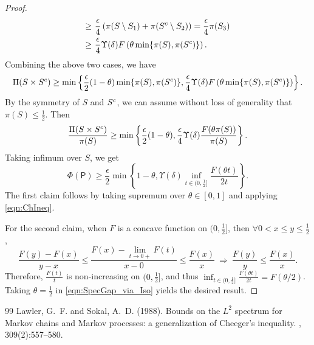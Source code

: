 \documentclass[10pt,a4paper]{amsart}
\newcommand{\Brac}[1]{\left(#1\right)}
\newcommand{\St}{\Rightarrow}
\newcommand{\matc}{^{\rm c}}
\newcommand{\sfP}{\mathsf{P}}
\begin{document}
\begin{proof}
\begin{align*}
    \ge~& \frac{\epsilon}{4} \Brac{ \pi(S\setminus S_1) + \pi(S\matc\setminus S_2)  } = \frac{\epsilon}{4} \pi(S_3) \\
    \ge~& \frac{\epsilon}{4} \Upsilon(\delta) F \Brac{ \theta \min \{ \pi(S), \pi(S\matc) \} }.
\end{align*}
%
Combining the above two cases, we have
\[
    \Pi(S \times S\matc) \ge \min \left\{ \frac{\epsilon}{2} (1-\theta) \min \{ \pi(S), \pi(S\matc) \}, \frac{\epsilon}{4} \Upsilon(\delta) F \Brac{ \theta \min \{ \pi(S), \pi(S\matc) \} } \right\}.
\]
By the symmetry of $S$ and $S\matc$, we can assume without loss of generality that $\pi(S) \le \frac{1}{2}$.
Then
\[
    \frac{\Pi(S \times S\matc)}{\pi(S)} \ge \min \left\{ \frac{\epsilon}{2} (1-\theta), \frac{\epsilon}{4} \Upsilon(\delta) \frac{ F(\theta \pi(S)) }{ \pi(S) } \right\}.
\]
Taking infimum over $S$, we get
\[
    \Phi(\sfP) \ge \frac{\epsilon}{2} \min \left\{ 1-\theta , \Upsilon(\delta) \inf_{t\in(0,\frac{1}{2}]} \frac{ F(\theta t) }{ 2t } \right\}.
\]
The first claim follows by taking supremum over $\theta\in[0,1]$ and applying \eqref{eqn:ChIneq}.

For the second claim, when $F$ is a concave function on $(0,\frac{1}{2}]$, then $\forall 0<x\le y\le \frac{1}{2}$,
\[
    \frac{F(y)-F(x)}{y-x} \le \frac{F(x) - \lim_{t \to 0+} F(t) }{x - 0} \le \frac{F(x)}{x} ~\St~ \frac{F(y)}{y} \le \frac{F(x)}{x}.
\]
Therefore, $\frac{F(t)}{t}$ is non-increasing on $(0,\frac{1}{2}]$, and thus $\inf_{t\in(0,\frac{1}{2}]} \frac{ F(\theta t) }{ 2t } = F(\theta/2)$.
Taking $\theta = \frac{1}{2}$ in \eqref{eqn:SpecGap_via_Iso} yields the desired result.
\end{proof}

\begin{thebibliography}{99}
 Lawler, G.~F. and Sokal, A.~D. (1988). \newblock Bounds on the {$L^2$} spectrum for {M}arkov chains and {M}arkov processes: a generalization of {C}heeger's inequality. , 309(2):557--580.
\end{thebibliography}
\end{document}

